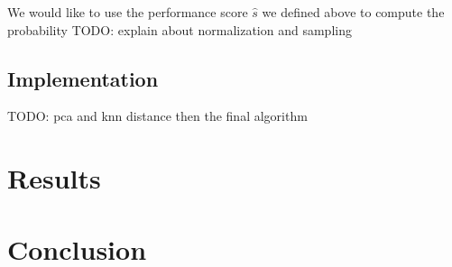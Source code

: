 \documentclass[11 pt, twocolumn]{article}
\newcommand{\todo}[1]{}
\renewcommand{\todo}[1]{{\color{red} TODO: {#1}}}
\begin{document}
We would like to use the performance score $\hat{s}$ we defined above to compute the probability \todo{explain about normalization and sampling}

\subsection{Implementation}
\todo{pca and knn distance then the final algorithm}

\section{Results}
\section{Conclusion}

 

\end{document}

